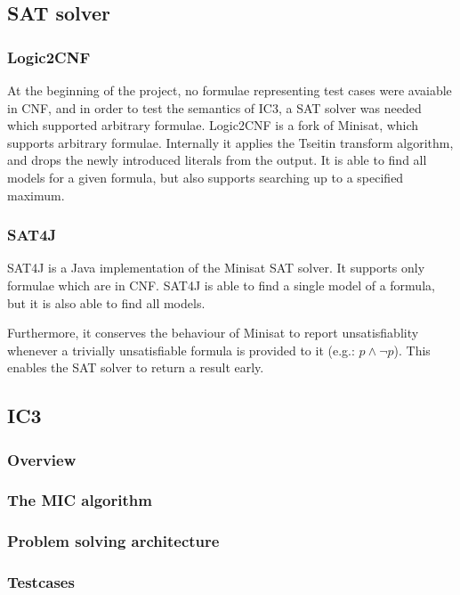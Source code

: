\documentclass[a4paper]{article}
\begin{document}
\subsection{SAT solver}
\subsubsection{Logic2CNF}
At the beginning of the project, no formulae representing test cases were avaiable in CNF, and in order to test the semantics of IC3, a SAT solver was needed which supported arbitrary formulae. Logic2CNF is a fork of Minisat, which supports arbitrary formulae. Internally it applies the Tseitin transform algorithm, and drops the newly introduced literals from the output. It is able to find all models for a given formula, but also supports searching up to a specified maximum.

\subsubsection{SAT4J}
SAT4J is a Java implementation of the Minisat SAT solver. It supports only formulae which are in CNF. SAT4J is able to find a single model of a formula, but it is also able to find all models.

Furthermore, it conserves the behaviour of Minisat to report unsatisfiablity whenever a trivially unsatisfiable formula is provided to it (e.g.: $p \land \lnot p$). This enables the SAT solver to return a result early.

\subsection{IC3}
\subsubsection{Overview}
\subsubsection{The MIC algorithm}
\subsubsection{Problem solving architecture}
\subsubsection{Testcases}
\end{document}
